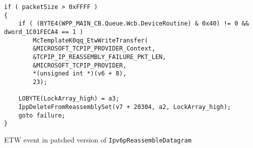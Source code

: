 \documentclass{report}
\begin{document}
\begin{listing}[H]
    \begin{verbatim}
if ( packetSize > 0xFFFF )
{
    if ( (BYTE4(WPP_MAIN_CB.Queue.Wcb.DeviceRoutine) & 0x40) != 0 && dword_1C01FECA4 == 1 )
        McTemplateK0qq_EtwWriteTransfer(
        &MICROSOFT_TCPIP_PROVIDER_Context,
        &TCPIP_IP_REASSEMBLY_FAILURE_PKT_LEN,
        &MICROSOFT_TCPIP_PROVIDER,
        *(unsigned int *)(v6 + 8),
        23);

    LOBYTE(LockArray_high) = a3;
    IppDeleteFromReassemblySet(v7 + 20304, a2, LockArray_high);
    goto failure;
}
\end{verbatim}
\caption{\gls{ETW} event in patched version of \texttt{Ipv6pReassembleDatagram}}
\label{listing:detection:etw:post-patch-event}
\end{listing}
\end{document}
